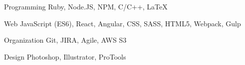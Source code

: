 

\begin{cvskills}

  \cvskill
    {Programming} %
    {Ruby, Node.JS, NPM, C/C++, LaTeX} %

  \cvskill
    {Web} %
    {JavaScript (ES6), React, Angular, CSS, SASS, HTML5, Webpack, Gulp} %

  \cvskill
    {Organization} %
    {Git, JIRA, Agile, AWS S3} %

  \cvskill
    {Design} %
    {Photoshop, Illustrator, ProTools} %

\end{cvskills}
